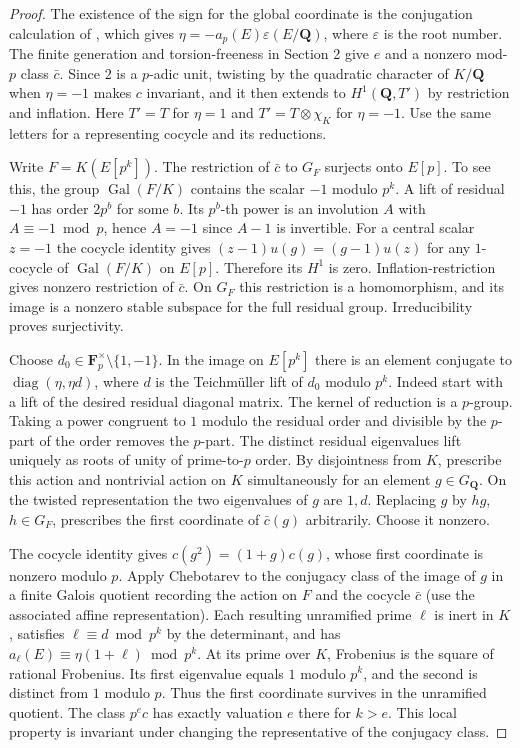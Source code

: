 \documentclass[11pt]{article}
\newcommand{\Q}{\mathbf Q}
\newcommand{\F}{\mathbf F}
\newcommand{\Gal}{\operatorname{Gal}}
\begin{document}
\begin{proof}
The existence of the sign for the global coordinate is the conjugation calculation of \cite[Cor.~2.9 and proof of Thm.~3.4]{FG}, which gives \(\eta=-a_p(E)\varepsilon(E/\Q)\), where \(\varepsilon\) is the root number. The finite generation and torsion-freeness in Section 2 give \(e\) and a nonzero mod-\(p\) class \(\bar c\). Since \(2\) is a \(p\)-adic unit, twisting by the quadratic character of \(K/\Q\) when \(\eta=-1\) makes \(c\) invariant, and it then extends to \(H^1(\Q,T')\) by restriction and inflation. Here \(T'=T\) for \(\eta=1\) and \(T'=T\otimes\chi_K\) for \(\eta=-1\). Use the same letters for a representing cocycle and its reductions.

Write \(F=K(E[p^k])\). The restriction of \(\bar c\) to \(G_F\) surjects onto \(E[p]\). To see this, the group \(\Gal(F/K)\) contains the scalar \(-1\) modulo \(p^k\). A lift of residual \(-1\) has order \(2p^b\) for some \(b\). Its \(p^b\)-th power is an involution \(A\) with \(A\equiv-1\bmod p\), hence \(A=-1\) since \(A-1\) is invertible. For a central scalar \(z=-1\) the cocycle identity gives \((z-1)u(g)=(g-1)u(z)\) for any \(1\)-cocycle of \(\Gal(F/K)\) on \(E[p]\). Therefore its \(H^1\) is zero. Inflation-restriction gives nonzero restriction of \(\bar c\). On \(G_F\) this restriction is a homomorphism, and its image is a nonzero stable subspace for the full residual group. Irreducibility proves surjectivity.

Choose \(d_0\in\F_p^\times\setminus\{1,-1\}\). In the image on \(E[p^k]\) there is an element conjugate to \(\operatorname{diag}(\eta,\eta d)\), where \(d\) is the Teichm\"uller lift of \(d_0\) modulo \(p^k\). Indeed start with a lift of the desired residual diagonal matrix. The kernel of reduction is a \(p\)-group. Taking a power congruent to \(1\) modulo the residual order and divisible by the \(p\)-part of the order removes the \(p\)-part. The distinct residual eigenvalues lift uniquely as roots of unity of prime-to-\(p\) order. By disjointness from \(K\), prescribe this action and nontrivial action on \(K\) simultaneously for an element \(g\in G_{\Q}\). On the twisted representation the two eigenvalues of \(g\) are \(1,d\). Replacing \(g\) by \(hg\), \(h\in G_F\), prescribes the first coordinate of \(\bar c(g)\) arbitrarily. Choose it nonzero.

The cocycle identity gives \(c(g^2)=(1+g)c(g)\), whose first coordinate is nonzero modulo \(p\). Apply Chebotarev to the conjugacy class of the image of \(g\) in a finite Galois quotient recording the action on \(F\) and the cocycle \(\bar c\) (use the associated affine representation). Each resulting unramified prime \(\ell\) is inert in \(K\), satisfies \(\ell\equiv d\bmod p^k\) by the determinant, and has \(a_\ell(E)\equiv\eta(1+\ell)\bmod p^k\). At its prime over \(K\), Frobenius is the square of rational Frobenius. Its first eigenvalue equals \(1\) modulo \(p^k\), and the second is distinct from \(1\) modulo \(p\). Thus the first coordinate survives in the unramified quotient. The class \(p^e c\) has exactly valuation \(e\) there for \(k>e\). This local property is invariant under changing the representative of the conjugacy class.
\end{proof}
\end{document}
